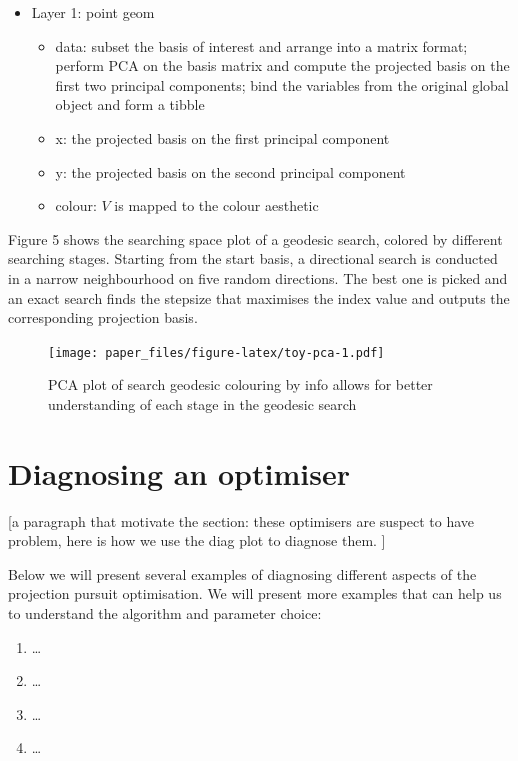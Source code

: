 \documentclass[12pt]{article}
\providecommand{\tightlist}{%
  \setlength{\itemsep}{0pt}\setlength{\parskip}{0pt}}
\begin{document}
\begin{itemize}
\tightlist
\item
  Layer 1: point geom

  \begin{itemize}
  \tightlist
  \item
    data: subset the basis of interest and arrange into a matrix format;
    perform PCA on the basis matrix and compute the projected basis on
    the first two principal components; bind the variables from the
    original global object and form a tibble
  \item
    x: the projected basis on the first principal component
  \item
    y: the projected basis on the second principal component
  \item
    colour: \(V\) is mapped to the colour aesthetic
  \end{itemize}
\end{itemize}

Figure 5 shows the searching space plot of a geodesic search, colored by
different searching stages. Starting from the start basis, a directional
search is conducted in a narrow neighbourhood on five random directions.
The best one is picked and an exact search finds the stepsize that
maximises the index value and outputs the corresponding projection
basis.

\begin{figure}
\centering
\texttt{[image: paper\_files/figure-latex/toy-pca-1.pdf]}
\caption{\label{toy-pca}PCA plot of search geodesic colouring by info
allows for better understanding of each stage in the geodesic search}
\end{figure}

\newpage

\hypertarget{application}{%
\section{Diagnosing an optimiser}\label{application}}

{[}a paragraph that motivate the section: these optimisers are suspect
to have problem, here is how we use the diag plot to diagnose them. {]}

Below we will present several examples of diagnosing different aspects
of the projection pursuit optimisation. We will present more examples
that can help us to understand the algorithm and parameter choice:

\begin{enumerate}
\def\labelenumi{\arabic{enumi})}
\tightlist
\item
  \ldots{}
\item
  \ldots{}
\item
  \ldots{}
\item
  \ldots{}
\end{enumerate}
\end{document}
